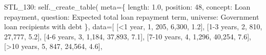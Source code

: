 \documentclass[
  11pt,
  a4paper,
]{article}
\newenvironment{Shaded}{\begin{snugshade}}{\end{snugshade}}
\newcommand{\NormalTok}[1]{\textcolor[rgb]{0.00,0.23,0.31}{#1}}
\newcommand{\OperatorTok}[1]{\textcolor[rgb]{0.37,0.37,0.37}{#1}}
\newcommand{\StringTok}[1]{\textcolor[rgb]{0.13,0.47,0.30}{#1}}
\newcommand{\VariableTok}[1]{\textcolor[rgb]{0.07,0.07,0.07}{#1}}
\begin{document}
\begin{Shaded}
\begin{Highlighting}[]
            \StringTok{\textquotesingle{}STL\_130\textquotesingle{}}\NormalTok{: }\VariableTok{self}\NormalTok{.\_create\_table(}
\NormalTok{                meta}\OperatorTok{=}\NormalTok{\{}
                \StringTok{\textquotesingle{}length\textquotesingle{}}\NormalTok{: }\StringTok{\textquotesingle{}1.0\textquotesingle{}}\NormalTok{, }\StringTok{\textquotesingle{}position\textquotesingle{}}\NormalTok{: }\StringTok{\textquotesingle{}48\textquotesingle{}}\NormalTok{,}
                \StringTok{\textquotesingle{}concept\textquotesingle{}}\NormalTok{: }\StringTok{\textquotesingle{}Loan repayment\textquotesingle{}}\NormalTok{,}
                \StringTok{\textquotesingle{}question\textquotesingle{}}\NormalTok{: }\StringTok{\textquotesingle{}Expected total loan repayment term\textquotesingle{}}\NormalTok{,}
                \StringTok{\textquotesingle{}universe\textquotesingle{}}\NormalTok{: }\StringTok{\textquotesingle{}Government loan recipients with debt\textquotesingle{}}
\NormalTok{                \},}
\NormalTok{                data}\OperatorTok{=}\NormalTok{[}
\NormalTok{                [}\StringTok{\textquotesingle{}\textless{}1 year\textquotesingle{}}\NormalTok{, }\StringTok{\textquotesingle{}1\textquotesingle{}}\NormalTok{, }\StringTok{\textquotesingle{}205\textquotesingle{}}\NormalTok{, }\StringTok{\textquotesingle{}6,300\textquotesingle{}}\NormalTok{, }\StringTok{\textquotesingle{}1.2\textquotesingle{}}\NormalTok{],}
\NormalTok{                [}\StringTok{\textquotesingle{}1{-}3 years\textquotesingle{}}\NormalTok{, }\StringTok{\textquotesingle{}2\textquotesingle{}}\NormalTok{, }\StringTok{\textquotesingle{}810\textquotesingle{}}\NormalTok{, }\StringTok{\textquotesingle{}27,777\textquotesingle{}}\NormalTok{, }\StringTok{\textquotesingle{}5.2\textquotesingle{}}\NormalTok{],}
\NormalTok{                [}\StringTok{\textquotesingle{}4{-}6 years\textquotesingle{}}\NormalTok{, }\StringTok{\textquotesingle{}3\textquotesingle{}}\NormalTok{, }\StringTok{\textquotesingle{}1,184\textquotesingle{}}\NormalTok{, }\StringTok{\textquotesingle{}37,893\textquotesingle{}}\NormalTok{, }\StringTok{\textquotesingle{}7.1\textquotesingle{}}\NormalTok{],}
\NormalTok{                [}\StringTok{\textquotesingle{}7{-}10 years\textquotesingle{}}\NormalTok{, }\StringTok{\textquotesingle{}4\textquotesingle{}}\NormalTok{, }\StringTok{\textquotesingle{}1,296\textquotesingle{}}\NormalTok{, }\StringTok{\textquotesingle{}40,254\textquotesingle{}}\NormalTok{, }\StringTok{\textquotesingle{}7.6\textquotesingle{}}\NormalTok{],}
\NormalTok{                [}\StringTok{\textquotesingle{}\textgreater{}10 years\textquotesingle{}}\NormalTok{, }\StringTok{\textquotesingle{}5\textquotesingle{}}\NormalTok{, }\StringTok{\textquotesingle{}847\textquotesingle{}}\NormalTok{, }\StringTok{\textquotesingle{}24,564\textquotesingle{}}\NormalTok{, }\StringTok{\textquotesingle{}4.6\textquotesingle{}}\NormalTok{],}

\end{Highlighting}
\end{Shaded}
\end{document}
